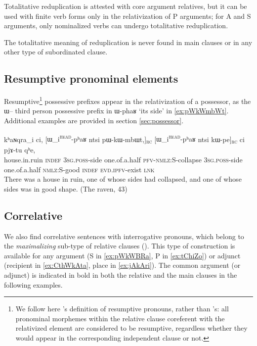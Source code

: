 \documentclass[oldfontcommands,oneside,a4paper,11pt]{article}
\newcommand{\ipa}[1]{{\phon #1}} %
\newcommand{\tete}{\textsuperscript{\textsc{head}}}
\newcommand{\rc}{\textsubscript{\textsc{rc}}}
\begin{document}
Totalitative reduplication is attested with core argument relatives, but it can be used with finite verb forms only in the relativization of P arguments; for A and S arguments, only nominalized verbs can undergo totalitative reduplication. 

The totalitative meaning of reduplication is never found in main clauses or in any other type of subordinated clause.


\subsection{Resumptive pronominal elements} \label{sec:resumptive}
 

Resumptive\footnote{We follow here \citet[211]{creissels06sgit2}'s definition of resumptive pronouns, rather than \citet{comrie81relative}'s: all pronominal morphemes within the relative clause coreferent with the relativized element are considered to be resumptive, regardless whether they would appear in the corresponding independent clause or not. } possessive prefixes appear in the relativization of a possessor, as the \ipa{ɯ}-- third person possessive prefix in \ipa{ɯ-phaʁ} `its side' in  \ref{ex:pWkWmbWt}. Additional examples are provided in section \ref{sec:possessor}.

  \begin{exe}
\ex \label{ex:pWkWmbWt}
\gll
\ipa{kʰaɴqra}_i  	\ipa{ci,}  	[\ipa{ɯ_i\tete{}-pʰaʁ}	\ipa{ntsi}  	\ipa{pɯ-kɯ-mbɯt,}]\rc{}  	[\ipa{ɯ_i\tete{}-pʰaʁ}   	\ipa{ntsi}  	\ipa{kɯ-pe}]\rc{}  	\ipa{ci}  	\ipa{pjɤ-tu}  	\ipa{qʰe,}  \\
house.in.ruin \textsc{indef} \textsc{3sg.poss}-side one.of.a.half \textsc{pfv-nmlz}:S-collapse \textsc{3sg.poss}-side one.of.a.half \textsc{nmlz}:S-good \textsc{indef} \textsc{evd.ipfv}-exist  \textsc{lnk} \\
\glt There was a house in ruin, one of whose sides had collapsed, and one of whose sides was in good shape. (The raven, 43)
\end{exe}


\subsection{Correlative} \label{sec:correlative}
We also find correlative sentences with interrogative pronouns, which belong to the \textit{maximalizing} sub-type of relative clauses (\citealt{grosu98maximalizing}).
 This type of construction is available for any argument (S in \ref{ex:pWkWBRa}, P in \ref{ex:tChiZo}) or adjunct (recipient in \ref{ex:CthWkAta}, place in \ref{ex:jAkAri}). The common argument (or adjunct) is indicated in bold in both the relative and the main clauses in the following examples.
\end{document}
